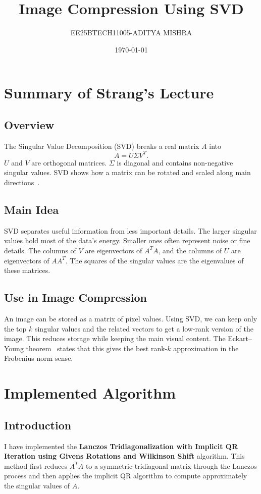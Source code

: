 \documentclass[13pt]{article}
\title{Image Compression Using SVD}
\author{EE25BTECH11005-ADITYA MISHRA}
\date{\today}
\begin{document}
\maketitle
\tableofcontents
\newpage
\section{Summary of Strang's Lecture}
\subsection{Overview}
The Singular Value Decomposition (SVD) breaks a real matrix \(A\) into
\[
A = U \Sigma V^{T}.
\]
\(U\) and \(V\) are orthogonal matrices. \(\Sigma\) is diagonal and contains non-negative singular values. SVD shows how a matrix can be rotated and scaled along main directions~\cite{strangSVD}.

\subsection{Main Idea}
SVD separates useful information from less important details. The larger singular values hold most of the data’s energy. Smaller ones often represent noise or fine details.  
The columns of \(V\) are eigenvectors of \(A^{T}A\), and the columns of \(U\) are eigenvectors of \(A A^{T}\). The squares of the singular values are the eigenvalues of these matrices.

\subsection{Use in Image Compression}
An image can be stored as a matrix of pixel values. Using SVD, we can keep only the top \(k\) singular values and the related vectors to get a low-rank version of the image. This reduces storage while keeping the main visual content.  
The Eckart–Young theorem~\cite{eckart1936approximation} states that this gives the best rank-\(k\) approximation in the Frobenius norm sense.

\section{Implemented Algorithm}
\subsection{Introduction}

I have implemented the \textbf{Lanczos Tridiagonalization with Implicit QR Iteration using Givens Rotations and Wilkinson Shift} algorithm. This method first reduces \(A^T A\) to a symmetric tridiagonal matrix through the Lanczos process and then applies the implicit QR algorithm to compute approximately the singular values of \(A\).
\end{document}

